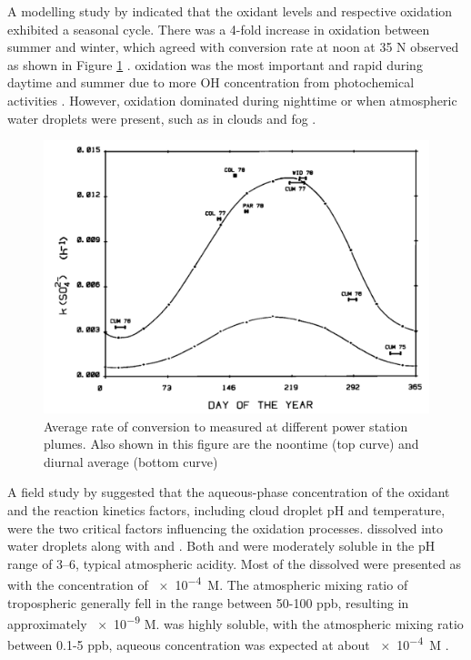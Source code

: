 A modelling study by \citet{feichterSimulationTroposphericSulfur1996} indicated that the oxidant levels and respective oxidation exhibited a seasonal cycle. There was a 4-fold increase in  oxidation between summer and winter, which agreed with  conversion rate at noon at 35 \textdegree N observed as shown in Figure \ref{fig:ch4:meagher1983} \citep{meagherSeasonalVariationAtmospheric1983}.  oxidation was the most important and rapid during daytime and summer due to more OH concentration from photochemical activities \citep{eatoughConversionSO2Sulfate1994}. However,  oxidation dominated during nighttime or when atmospheric water droplets were present, such as in clouds and fog \cite[e.g. ][]{heggMeasurementsSulfateProduction1982, gillaniGasparticleConversionSulfur1983, husainStudyHeterogeneousOxidation1991, eatoughConversionSO2Sulfate1994}. 


\begin{figure}
    \centering
    \includegraphics[width=0.8\linewidth]{Chapter4/Figs/meagher1983.png}
    \caption{Average rate of  conversion to  measured at different power station plumes. Also shown in this figure are the noontime (top curve) and diurnal average (bottom curve) \citep{meagherSeasonalVariationAtmospheric1983}}
    \label{fig:ch4:meagher1983}
\end{figure}


A field study by \citet{eatoughConversionSO2Sulfate1994} suggested that the aqueous-phase concentration of the oxidant and the reaction kinetics factors, including cloud droplet pH and temperature, were the two critical factors influencing the oxidation processes.  dissolved into water droplets along with  and . Both  and  were moderately soluble in the pH range of 3--6, typical atmospheric acidity. Most of the dissolved  were presented as  with the concentration of \qty{e-4}{M}. The atmospheric mixing ratio of tropospheric  generally fell in the range between 50-100 ppb, resulting in approximately \num[]{e-9} M.  was highly soluble, with the atmospheric mixing ratio between 0.1-5 ppb, aqueous concentration was expected at about \qty{e-4}{M} \cite{eatoughConversionSO2Sulfate1994}.

